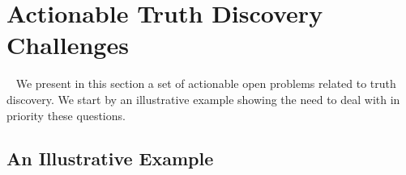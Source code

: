 \documentclass[prodmode,acmtecs]{acmsmall} %
\begin{document}
  
  
  


 
\section{Actionable Truth Discovery Challenges}~\label{sect:challenges-solutions}
We present in this section a set of actionable open problems related to truth discovery. We start by an illustrative
example showing the need to deal with in priority these questions.
\subsection{ An Illustrative Example}
\end{document}

